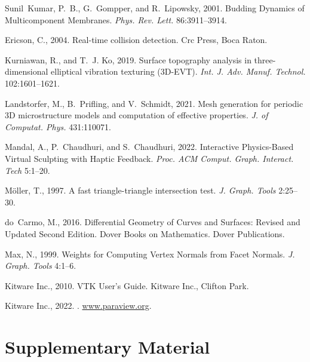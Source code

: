 \documentclass[twocolumn]{biophys-new}
\begin{document}
\begin{thebibliography}{52}
Sunil~Kumar, P.~B., G.~Gompper, and R.~Lipowsky, 2001.
\newblock Budding Dynamics of Multicomponent Membranes.
\newblock \emph{Phys. Rev. Lett.} 86:3911--3914.

Ericson, C., 2004.
\newblock Real-time collision detection.
\newblock Crc Press, Boca Raton.

Kurniawan, R., and T.~J. Ko, 2019.
\newblock Surface topography analysis in three-dimensional elliptical vibration
  texturing (3D-EVT).
\newblock \emph{Int. J. Adv. Manuf. Technol.} 102:1601--1621.

Landstorfer, M., B.~Prifling, and V.~Schmidt, 2021.
\newblock Mesh generation for periodic 3D microstructure models and computation
  of effective properties.
\newblock \emph{J. of Computat. Phys.} 431:110071.

Mandal, A., P.~Chaudhuri, and S.~Chaudhuri, 2022.
\newblock Interactive Physics-Based Virtual Sculpting with Haptic Feedback.
\newblock \emph{Proc. ACM Comput. Graph. Interact. Tech} 5:1--20.

M{\"o}ller, T., 1997.
\newblock A fast triangle-triangle intersection test.
\newblock \emph{J. Graph. Tools} 2:25--30.

do~Carmo, M., 2016.
\newblock Differential Geometry of Curves and Surfaces: Revised and Updated
  Second Edition.
\newblock Dover Books on Mathematics. Dover Publications.

Max, N., 1999.
\newblock Weights for Computing Vertex Normals from Facet Normals.
\newblock \emph{J. Graph. Tools} 4:1--6.

{Kitware Inc.}, 2010.
\newblock VTK User's Guide.
\newblock Kitware Inc., Clifton Park.

{Kitware Inc.}, 2022.
.
\newblock \urlprefix\url{www.paraview.org}.

\end{thebibliography}
\section*{Supplementary Material}
\end{document}
